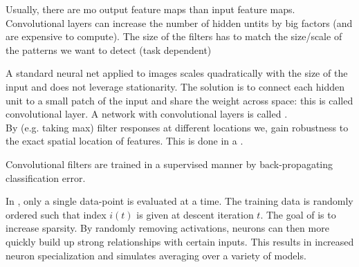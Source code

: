 \documentclass{article}
\begin{document}
\begin{remark}
  Usually, there are mo output feature maps than input feature maps. Convolutional layers can increase the number of hidden untits by big factors (and are expensive to compute). The size of the filters has to match the size/scale of the patterns we want to detect (task dependent)
\end{remark}

A standard neural net applied to images scales quadratically with the size of the input and does not leverage stationarity. The solution is to connect each hidden unit to a small patch of the input and share the weight across space: this is called convolutional layer. A network with convolutional layers is called . \\ 

By  (e.g. taking max) filter responses at different locations we, gain robustness to the exact spatial location of features. This is done in a . \\ 

\begin{remark}
  Convolutional filters are trained in a supervised manner by back-propagating classification error.
\end{remark}

In , only a single data-point is evaluated at a time. The training data is randomly ordered such that index $i(t)$ is given at descent iteration $t$. The goal of  is to increase sparsity. By randomly removing activations, neurons can then more quickly build up strong relationships with certain inputs. This results in increased neuron specialization and simulates averaging over a variety of models. 
\end{document}
